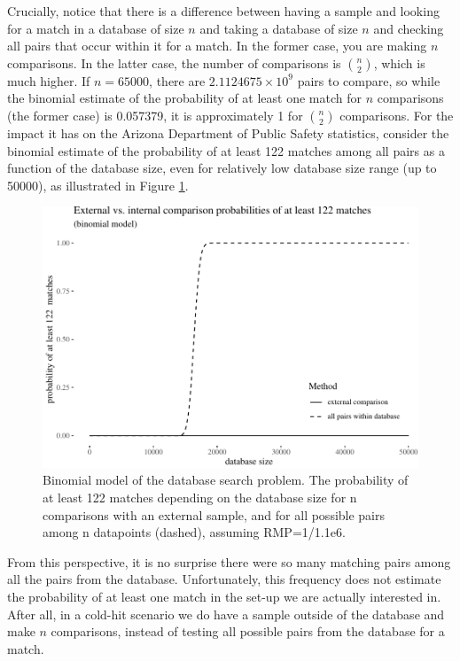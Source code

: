 \documentclass[
  10pt,
  dvipsnames,enabledeprecatedfontcommands]{scrartcl}
\begin{document}
Crucially, notice that there is a difference between having a sample and
looking for a match in a database of size \(n\) and taking a database of
size \(n\) and checking all pairs that occur within it for a match. In
the former case, you are making \(n\) comparisons. In the latter case,
the number of comparisons is \({n \choose 2}\), which is much higher. If
\(n=65000\), there are \ensuremath{2.1124675\times 10^{9}} pairs to
compare, so while the binomial estimate of the probability of at least
one match for \(n\) comparisons (the former case) is 0.057379, it is
approximately 1 for \({n \choose 2}\) comparisons. For the impact it has
on the Arizona Department of Public Safety statistics, consider the
binomial estimate of the probability of at least 122 matches among all
pairs as a function of the database size, even for relatively low
database size range (up to 50000), as illustrated in Figure
\ref{fig:Arizona}.

\begin{figure}[h]

\begin{center}\includegraphics[width=1\linewidth]{lr-chapter4_files/figure-latex/fig-Arizona-1} \end{center}
\caption{Binomial model of the database search problem. The probability of at least 122 matches depending on the database size for n comparisons with an external sample, and for all possible pairs among n datapoints (dashed), assuming RMP=1/1.1e6.}
\label{fig:Arizona}
\end{figure}

From this perspective, it is no surprise there were so many matching
pairs among all the pairs from the database. Unfortunately, this
frequency does not estimate the probability of at least one match in the
set-up we are actually interested in. After all, in a cold-hit scenario
we do have a sample outside of the database and make \(n\) comparisons,
instead of testing all possible pairs from the database for a match.
\end{document}
